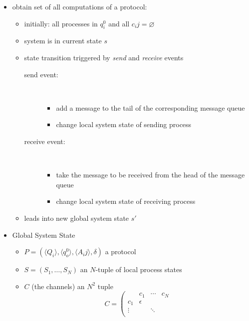 \documentclass[a4paper, 10pt]{article}
\begin{document}
\begin{itemize}
    \item obtain set of all computations of a protocol:
    \begin{itemize}
        \item initially: all processes in $q_i^0$ and all $c_ij=\varnothing$
        \item system is in current state $s$
        \item state transition triggered by \emph{send} and \emph{receive} events
        \begin{description}
            \item[send event:] \ \\
            \begin{itemize}
                \item add a message to the tail of the corresponding message queue
                \item change local system state of sending process
            \end{itemize}
            \item[receive event:] \ \\
            \begin{itemize}
                \item take the message to be received from the head of the message queue
                \item change local system state of receiving process
            \end{itemize}
        \end{description}
        \item leads into new global system state $s'$
    \end{itemize}
    \item Global System State
    \begin{itemize}
        \item $P=\left(\langle Q_i\rangle,\langle q_o^0 \rangle, \langle A_ij \rangle,\delta \right)$ a protocol
        \item $S=(S_1,\dots,S_N)$ an $N$-tuple of local process states
        \item $C$ (the channels) an $N^2$ tuple \\
        \[C= \left(
        \begin{array}{cccc}
         & c_1 & \cdots & c_N \\
         c_1 & \epsilon & & \\
         \vdots & & \ddots & \\

\end{array}\]
\end{itemize}
\end{itemize}
\end{document}
